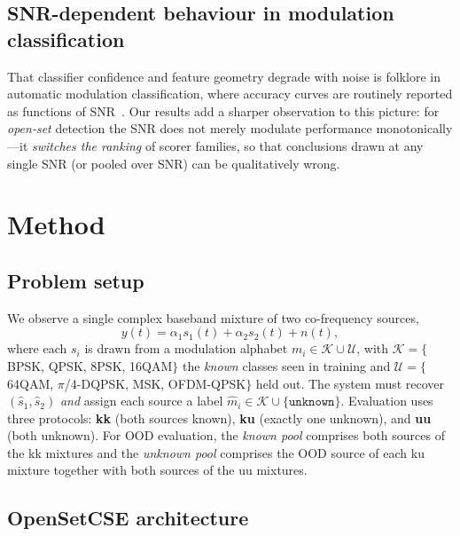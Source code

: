 \documentclass[review,12pt]{elsarticle}
\begin{document}
\subsection{SNR-dependent behaviour in modulation classification}

That classifier confidence and feature geometry degrade with noise is
folklore in automatic modulation classification, where accuracy curves
are routinely reported as functions of
SNR~\cite{proakis2008digital,oshea2017intro}. Our results add a sharper
observation to this picture: for \emph{open-set} detection the SNR does
not merely modulate performance monotonically---it \emph{switches the
ranking} of scorer families, so that conclusions drawn at any single
SNR (or pooled over SNR) can be qualitatively wrong.

\section{Method}
\label{sec:method}

\subsection{Problem setup}
\label{sec:setup}

We observe a single complex baseband mixture of two co-frequency
sources,
\begin{equation}
  y(t) = \alpha_1 s_1(t) + \alpha_2 s_2(t) + n(t),
  \label{eq:mix}
\end{equation}
where each $s_i$ is drawn from a modulation alphabet
$m_i \in \mathcal{K} \cup \mathcal{U}$, with
$\mathcal{K} = \{$BPSK, QPSK, 8PSK, 16QAM$\}$ the \emph{known} classes
seen in training and
$\mathcal{U} = \{$64QAM, $\pi$/4-DQPSK, MSK, OFDM-QPSK$\}$ held out.
The system must recover $(\hat{s}_1, \hat{s}_2)$ \emph{and} assign each
source a label
$\hat{m}_i \in \mathcal{K} \cup \{\texttt{unknown}\}$.
Evaluation uses three protocols: \textbf{kk} (both sources known),
\textbf{ku} (exactly one unknown), and \textbf{uu} (both unknown).
For OOD evaluation, the \emph{known pool} comprises both sources of the
kk mixtures and the \emph{unknown pool} comprises the OOD source of
each ku mixture together with both sources of the uu mixtures.

\subsection{OpenSetCSE architecture}
\label{sec:arch}
\end{document}
